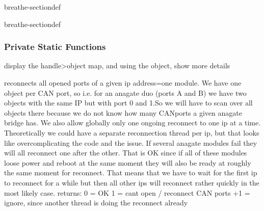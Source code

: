 \documentclass[a4paper,10pt,english]{sphinxmanual}
\begin{document}
\begin{fulllineitems}
\begin{sphinxuseclass}{breathe-sectiondef}
\begin{fulllineitems}
\end{fulllineitems}


\end{sphinxuseclass}
\begin{sphinxuseclass}{breathe-sectiondef}\subsubsection*{Private Static Functions}


\begin{fulllineitems}
%
\pysigstartmultiline
{}%
\pysigstopmultiline
\sphinxAtStartPar
display the handle\sphinxhyphen{}\textgreater{}object map, and using the object, show more details 

\end{fulllineitems}



\begin{fulllineitems}
%
\pysigstartmultiline
{}%
\pysigstopmultiline
\sphinxAtStartPar
reconnects all opened ports of a given ip address=one module. We have one object per CAN port, so i.e. for an anagate duo (ports A and B) we have two objects with the same IP but with port 0 and 1.So we will have to scan over all objects there because we do not know how many CANports a given anagate bridge has. We also allow globally only one ongoing reconnect to one ip at a time. Theoretically we could have a separate reconnection thread per ip, but that looks like overcomplicating the code and the issue. If several anagate modules fail they will all reconnect one after the other. That is OK since if all of these modules loose power and reboot at the same moment they will also be ready at roughly the same moment for reconnect. That means that we have to wait for the first ip to reconnect for a while but then all other ips will reconnect rather quickly in the most likely case. returns: 0 = OK \sphinxhyphen{}1 = cant open / reconnect CAN ports +1 = ignore, since another thread is doing the reconnect already 

\end{fulllineitems}




\end{sphinxuseclass}
\end{fulllineitems}
\end{document}
